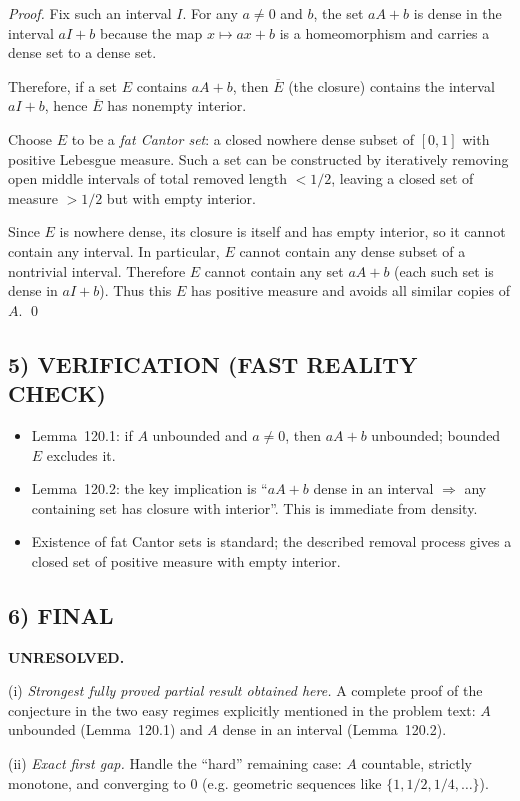 \emph{Proof.}
Fix such an interval $I$.  For any $a\neq0$ and $b$, the set $aA+b$ is dense in the interval $aI+b$ because the map $x\mapsto ax+b$ is a homeomorphism and carries a dense set to a dense set.

Therefore, if a set $E$ contains $aA+b$, then $\overline{E}$ (the closure) contains the interval $aI+b$, hence $\overline{E}$ has nonempty interior.

Choose $E$ to be a \emph{fat Cantor set}: a closed nowhere dense subset of $[0,1]$ with positive Lebesgue measure.  Such a set can be constructed by iteratively removing open middle intervals of total removed length $<1/2$, leaving a closed set of measure $>1/2$ but with empty interior.

Since $E$ is nowhere dense, its closure is itself and has empty interior, so it cannot contain any interval.  In particular, $E$ cannot contain any dense subset of a nontrivial interval.  Therefore $E$ cannot contain any set $aA+b$ (each such set is dense in $aI+b$).
Thus this $E$ has positive measure and avoids all similar copies of $A$. \qed

\subsection*{5) VERIFICATION (FAST REALITY CHECK)}
\begin{itemize}
\item Lemma~120.1: if $A$ unbounded and $a\neq0$, then $aA+b$ unbounded; bounded $E$ excludes it.
\item Lemma~120.2: the key implication is ``$aA+b$ dense in an interval $\Rightarrow$ any containing set has closure with interior''. This is immediate from density.
\item Existence of fat Cantor sets is standard; the described removal process gives a closed set of positive measure with empty interior.
\end{itemize}

\subsection*{6) FINAL}
\textbf{UNRESOLVED.}

(i) \emph{Strongest fully proved partial result obtained here.}
A complete proof of the conjecture in the two easy regimes explicitly mentioned in the problem text: $A$ unbounded (Lemma~120.1) and $A$ dense in an interval (Lemma~120.2).

(ii) \emph{Exact first gap.}
Handle the ``hard'' remaining case: $A$ countable, strictly monotone, and converging to $0$ (e.g. geometric sequences like $\{1,1/2,1/4,\dots\}$).

